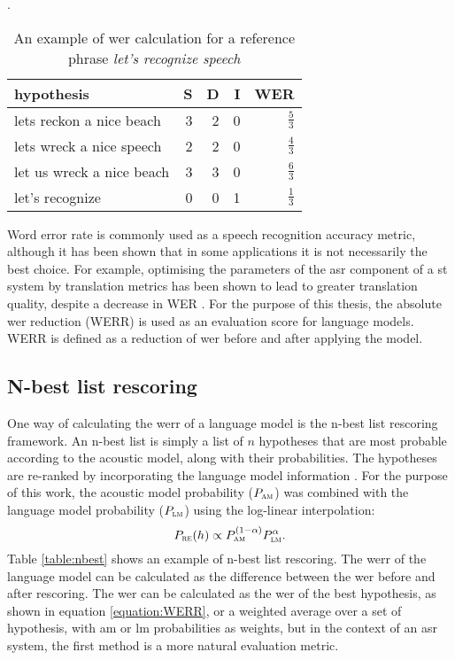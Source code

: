 \begin{table}[h!]
	\caption[An example of WER calculation]{An example of \gls{wer} calculation for a reference phrase \textit{let's recognize speech}}.
  \label{table:werr}
    \centering
    \begin{tabular*}{.6\linewidth}{@{\extracolsep{\fill}}lrrrr}
	        hypothesis                  & S & D & I & WER\\
		\midrule
		lets reckon a nice beach    & 3 & 2 & 0 & $\frac{5}{3}$\\
		lets wreck a nice speech    & 2 & 2 & 0 & $\frac{4}{3}$\\
		let us wreck a nice beach   & 3 & 3 & 0 & $\frac{6}{3}$\\
		let's recognize             & 0 & 0 & 1 & $\frac{1}{3}$\\
    \end{tabular*}
\end{table}

Word error rate is commonly used as a speech recognition accuracy metric, although it has been shown that in some applications it is not necessarily the best choice. For example, optimising the parameters of the \gls{asr} component of a \gls{st} system by translation metrics has been shown to lead to greater translation quality, despite a decrease in WER \cite{he2011word}. For the purpose of this thesis, the absolute \gls{wer} reduction (WERR) is used as an evaluation score for language models. WERR is defined as a reduction of \gls{wer} before and after applying the model.

	\subsection{N-best list rescoring}
	One way of calculating the \gls{werr} of a language model is the n-best list rescoring framework. An n-best list is simply a list of $n$ hypotheses that are most probable according to the acoustic model, along with their probabilities. The hypotheses are \mbox{re-ranked} by incorporating the language model information \cite{broman2005methods}. For the purpose of this work, the acoustic model probability ($P_{\textsc{am}}$) was combined with the language model probability ($P_{\textsc{lm}}$) using the log-linear interpolation:
	\begin{equation}
		P_{\textsc{re}}(h)\propto P_{\textsc{am}}^{(1-\alpha)}P_{\textsc{lm}}^{\alpha}.
	\end{equation}
	Table \ref{table:nbest} shows an example of n-best list rescoring. The \gls{werr} of the language model can be calculated as the difference between the \gls{wer} before and after rescoring. The \gls{wer} can be calculated as the \gls{wer} of the best hypothesis, as shown in equation \ref{equation:WERR}, or a weighted average over a set of hypothesis, with \gls{am} or \gls{lm} probabilities as weights, but in the context of an \gls{asr} system, the first method is a more natural evaluation metric.

